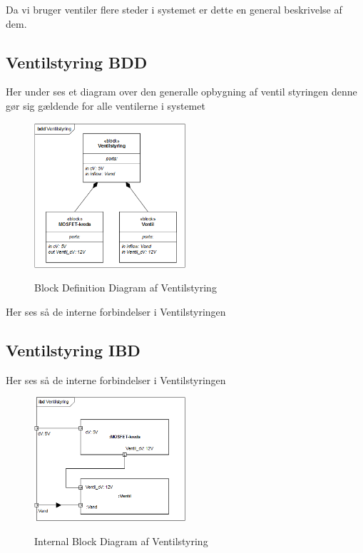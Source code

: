
Da vi bruger ventiler flere steder i systemet er dette en general beskrivelse af dem.

\subsection{Ventilstyring BDD}

Her under ses et diagram over den generalle opbygning af ventil styringen denne gør sig gældende for alle ventilerne i systemet

\begin{figure}[H]
	\centering
	\includegraphics[width=0.5\textwidth]{Systemarkitektur/Ventiler/Ventilstyring_BDD.png}
	\label{fig:Ventilstyring BDD}
	\caption{Block Definition Diagram af Ventilstyring}
\end{figure}

Her ses så de interne forbindelser i Ventilstyringen 

\subsection{Ventilstyring IBD}

Her ses så de interne forbindelser i Ventilstyringen 

\begin{figure}[H]
	\centering
	\includegraphics[width=0.5\textwidth]{Systemarkitektur/Ventiler/Ventilstyring_IBD.png}
	\label{fig:Ventilstyring IBD}
	\caption{Internal Block Diagram af Ventilstyring}
\end{figure}


